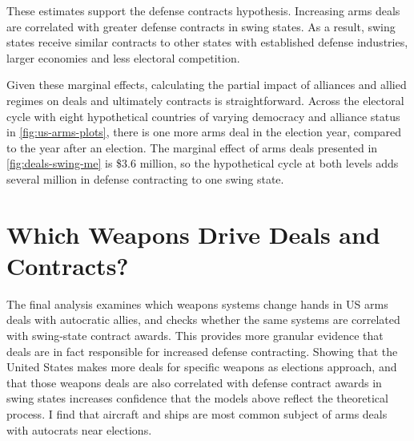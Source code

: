 \documentclass[12pt]{article}
\begin{document}
These estimates support the defense contracts hypothesis. 
Increasing arms deals are correlated with greater defense contracts in swing states. 
As a result, swing states receive similar contracts to other states with established defense industries, larger economies and less electoral competition. 
%
%
%
%


Given these marginal effects, calculating the partial impact of alliances and allied regimes on deals and ultimately contracts is straightforward. 
Across the electoral cycle with eight hypothetical countries of varying democracy and alliance status in \autoref{fig:us-arms-plots}, there is one more arms deal in the election year, compared to the year after an election. 
The marginal effect of arms deals presented in \autoref{fig:deals-swing-me} is \$3.6 million, so the hypothetical cycle at both levels adds several million in defense contracting to one swing state. 
%
%

 


\section{Which Weapons Drive Deals and Contracts?} 


The final analysis examines which weapons systems change hands in US arms deals with autocratic allies, and checks whether the same systems are correlated with swing-state contract awards. 
This provides more granular evidence that deals are in fact responsible for increased defense contracting. 
Showing that the United States makes more deals for specific weapons as elections approach, and that those weapons deals are also correlated with defense contract awards in swing states increases confidence that the models above reflect the theoretical process. 
I find that aircraft and ships are most common subject of arms deals with autocrats near elections.
\end{document}
